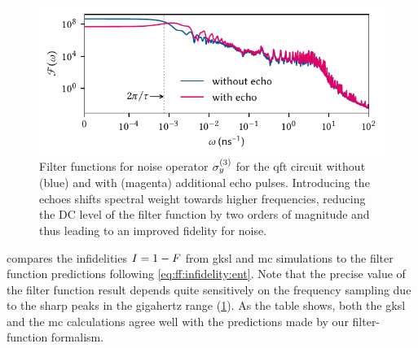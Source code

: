 \begin{figure}
    \centering
    \includegraphics{img/pdf/filter_functions/qft_filter_function_Y3}
    \caption[]{
        Filter functions for noise operator $\sigma_y\gth{3}$ for the \gls{qft} circuit without (blue) and with (magenta) additional echo pulses.
        Introducing the echoes shifts spectral weight towards higher frequencies, reducing the DC level of the filter function by two orders of magnitude and thus leading to an improved fidelity for \oneoverf noise.
    }
    \label{fig:app:qft_ff}
\end{figure}
\begin{table}
    \centering
    \renewcommand\arraystretch{1.25}
    \caption{
        Infidelities $\avginfid = 1-\avgfid$ of the \gls{qft} circuit due to noise on $\sigma_y\gth{3}$.
        \Gls{mc} values are averages over $N=1000$ random traces and have a relative error of \qty{3}{\percent}.
        We included frequencies in the range of $\omega\in [0, 100]\,\unit{\per\nano\second}$ for white noise, and $\omega\in [\qty{100}{\per\milli\second}, \qty{100}{\per\nano\second}]$ for pink noise.
        \Gls{ff} values are computed with $n_\omega=1000$ samples logarithmically distributed over the same interval.
        Prefactors in the power law $S(\omega)= A\omega^\alpha$ are \qty{2e-6}{\per\nano\second} and \qty{1e-9}{\per\nano\second\squared}, respectively.
    }
    \label{tab:app:fidelities}
    
\end{table}

 compares the infidelities $I=1-F$ from \gls{gksl} and \gls{mc} simulations to the filter function predictions following \cref{eq:ff:infidelity:ent}.
Note that the precise value of the filter function result depends quite sensitively on the frequency sampling due to the sharp peaks in the gigahertz range (\cref{fig:app:qft_ff}).
As the table shows, both the \gls{gksl} and the \gls{mc} calculations agree well with the predictions made by our filter-function formalism.
